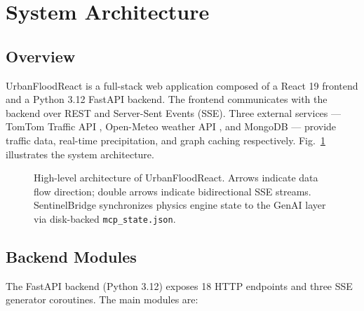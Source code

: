\documentclass[journal]{IEEEtran}
\begin{document}
\section{System Architecture}
\label{sec:arch}

\subsection{Overview}

UrbanFloodReact is a full-stack web application composed of a React 19 frontend and a
Python 3.12 FastAPI backend. The frontend communicates with the backend over REST and
Server-Sent Events (SSE). Three external services — TomTom Traffic API \cite{tomtom2024},
Open-Meteo weather API \cite{zippenfenig2023}, and MongoDB — provide traffic data,
real-time precipitation, and graph caching respectively. Fig.~\ref{fig:arch} illustrates
the system architecture.

\begin{figure}[H]
  \centering
  \caption{High-level architecture of UrbanFloodReact. Arrows indicate data flow direction;
  double arrows indicate bidirectional SSE streams. SentinelBridge synchronizes physics
  engine state to the GenAI layer via disk-backed \texttt{mcp\_state.json}.}
  \label{fig:arch}
\end{figure}

\subsection{Backend Modules}

The FastAPI backend (Python 3.12) exposes 18 HTTP endpoints and three SSE generator
coroutines. The main modules are:
\end{document}
